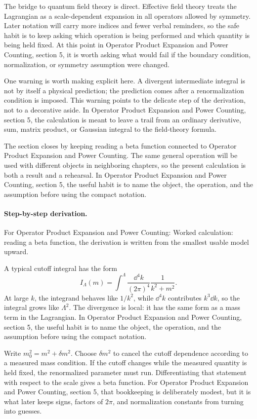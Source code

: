 The bridge to quantum field theory is direct.  Effective field theory treats the Lagrangian as a scale-dependent expansion in all operators allowed by symmetry.  Later notation will carry more indices and fewer verbal reminders, so the safe habit is to keep asking which operation is being performed and which quantity is being held fixed.  At this point in Operator Product Expansion and Power Counting, section 5, it is worth asking what would fail if the boundary condition, normalization, or symmetry assumption were changed.

One warning is worth making explicit here.  A divergent intermediate integral is not by itself a physical prediction; the prediction comes after a renormalization condition is imposed.  This warning points to the delicate step of the derivation, not to a decorative aside.  In Operator Product Expansion and Power Counting, section 5, the calculation is meant to leave a trail from an ordinary derivative, sum, matrix product, or Gaussian integral to the field-theory formula.

The section closes by keeping reading a beta function connected to Operator Product Expansion and Power Counting.  The same general operation will be used with different objects in neighboring chapters, so the present calculation is both a result and a rehearsal.  In Operator Product Expansion and Power Counting, section 5, the useful habit is to name the object, the operation, and the assumption before using the compact notation.



\paragraph{Step-by-step derivation.}

For Operator Product Expansion and Power Counting: Worked calculation: reading a beta function, the derivation is written from the smallest usable model upward.

A typical cutoff integral has the form
\[
  I_\Lambda(m)=\int^{\Lambda}\frac{\dd^4k}{(2\pi)^4}\frac{1}{k^2+m^2}.
\]
At large \(k\), the integrand behaves like \(1/k^2\), while \(\dd^4k\) contributes \(k^3\dd k\), so the integral grows like \(\Lambda^2\).  The divergence is local: it has the same form as a mass term in the Lagrangian.  In Operator Product Expansion and Power Counting, section 5, the useful habit is to name the object, the operation, and the assumption before using the compact notation.

Write \(m_0^2=m^2+\delta m^2\).  Choose \(\delta m^2\) to cancel the cutoff dependence according to a measured mass condition.  If the cutoff changes while the measured quantity is held fixed, the renormalized parameter must run.  Differentiating that statement with respect to the scale gives a beta function.  For Operator Product Expansion and Power Counting, section 5, that bookkeeping is deliberately modest, but it is what later keeps signs, factors of \(2\pi\), and normalization constants from turning into guesses.

